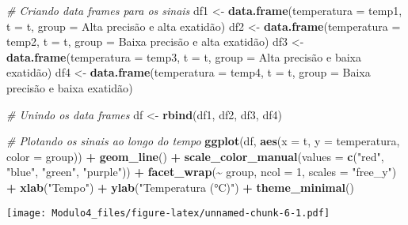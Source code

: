 \documentclass[
]{article}
\newenvironment{Shaded}{\begin{snugshade}}{\end{snugshade}}
\newcommand{\AttributeTok}[1]{\textcolor[rgb]{0.13,0.29,0.53}{#1}}
\newcommand{\CommentTok}[1]{\textcolor[rgb]{0.56,0.35,0.01}{\textit{#1}}}
\newcommand{\DecValTok}[1]{\textcolor[rgb]{0.00,0.00,0.81}{#1}}
\newcommand{\FunctionTok}[1]{\textcolor[rgb]{0.13,0.29,0.53}{\textbf{#1}}}
\newcommand{\NormalTok}[1]{#1}
\newcommand{\OtherTok}[1]{\textcolor[rgb]{0.56,0.35,0.01}{#1}}
\newcommand{\SpecialCharTok}[1]{\textcolor[rgb]{0.81,0.36,0.00}{\textbf{#1}}}
\newcommand{\StringTok}[1]{\textcolor[rgb]{0.31,0.60,0.02}{#1}}
\begin{document}
\begin{Shaded}
\begin{Highlighting}[]
\CommentTok{\# Criando data frames para os sinais}
\NormalTok{df1 }\OtherTok{\textless{}{-}} \FunctionTok{data.frame}\NormalTok{(}\AttributeTok{temperatura =}\NormalTok{ temp1, }\AttributeTok{t =}\NormalTok{ t, }\AttributeTok{group =} \StringTok{\textquotesingle{}Alta precisão e alta exatidão\textquotesingle{}}\NormalTok{)}
\NormalTok{df2 }\OtherTok{\textless{}{-}} \FunctionTok{data.frame}\NormalTok{(}\AttributeTok{temperatura =}\NormalTok{ temp2, }\AttributeTok{t =}\NormalTok{ t, }\AttributeTok{group =} \StringTok{\textquotesingle{}Baixa precisão e alta exatidão\textquotesingle{}}\NormalTok{)}
\NormalTok{df3 }\OtherTok{\textless{}{-}} \FunctionTok{data.frame}\NormalTok{(}\AttributeTok{temperatura =}\NormalTok{ temp3, }\AttributeTok{t =}\NormalTok{ t, }\AttributeTok{group =} \StringTok{\textquotesingle{}Alta precisão e baixa exatidão\textquotesingle{}}\NormalTok{)}
\NormalTok{df4 }\OtherTok{\textless{}{-}} \FunctionTok{data.frame}\NormalTok{(}\AttributeTok{temperatura =}\NormalTok{ temp4, }\AttributeTok{t =}\NormalTok{ t, }\AttributeTok{group =} \StringTok{\textquotesingle{}Baixa precisão e baixa exatidão\textquotesingle{}}\NormalTok{)}

\CommentTok{\# Unindo os data frames}
\NormalTok{df }\OtherTok{\textless{}{-}} \FunctionTok{rbind}\NormalTok{(df1, df2, df3, df4)}

\CommentTok{\# Plotando os sinais ao longo do tempo}
\FunctionTok{ggplot}\NormalTok{(df, }\FunctionTok{aes}\NormalTok{(}\AttributeTok{x =}\NormalTok{ t, }\AttributeTok{y =}\NormalTok{ temperatura, }\AttributeTok{color =}\NormalTok{ group)) }\SpecialCharTok{+}
  \FunctionTok{geom\_line}\NormalTok{() }\SpecialCharTok{+}
  \FunctionTok{scale\_color\_manual}\NormalTok{(}\AttributeTok{values =} \FunctionTok{c}\NormalTok{(}\StringTok{"red"}\NormalTok{, }\StringTok{"blue"}\NormalTok{, }\StringTok{"green"}\NormalTok{, }\StringTok{"purple"}\NormalTok{)) }\SpecialCharTok{+}
  \FunctionTok{facet\_wrap}\NormalTok{(}\SpecialCharTok{\textasciitilde{}}\NormalTok{ group, }\AttributeTok{ncol =} \DecValTok{1}\NormalTok{, }\AttributeTok{scales =} \StringTok{"free\_y"}\NormalTok{) }\SpecialCharTok{+}
  \FunctionTok{xlab}\NormalTok{(}\StringTok{"Tempo"}\NormalTok{) }\SpecialCharTok{+}
  \FunctionTok{ylab}\NormalTok{(}\StringTok{"Temperatura (°C)"}\NormalTok{) }\SpecialCharTok{+}
  \FunctionTok{theme\_minimal}\NormalTok{()}
\end{Highlighting}
\end{Shaded}

\texttt{[image: Modulo4\_files/figure-latex/unnamed-chunk-6-1.pdf]}
\end{document}
